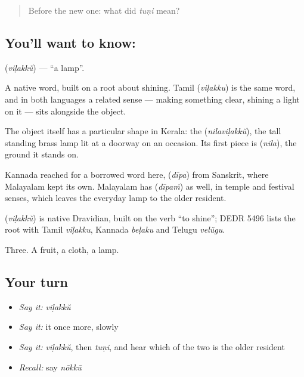 \begin{quote}
Before the new one: what did \emph{tuṇi} mean?
\end{quote}

\subsection*{You'll want to know: }
\textbf{} (\emph{viḷakkŭ}) — \textquotedblleft{}a lamp\textquotedblright{}.

A native word, built on a root about shining. Tamil  (\emph{viḷakku}) is the same word, and in both languages a related sense — making something clear, shining a light on it — sits alongside the object.

The object itself has a particular shape in Kerala: the  (\emph{nilaviḷakkŭ}), the tall standing brass lamp lit at a doorway on an occasion. Its first piece is  (\emph{nila}), the ground it stands on.

Kannada reached for a borrowed word here,  (\emph{dīpa}) from Sanskrit, where Malayalam kept its own. Malayalam has  (\emph{dīpaṁ}) as well, in temple and festival senses, which leaves the everyday lamp to the older resident.

\begin{cousinweb}
\textbf{} (\emph{viḷakkŭ}) is native Dravidian, built on the verb \textquotedblleft{}to shine\textquotedblright{}; DEDR 5496 lists the root with Tamil \emph{viḷakku}, Kannada \emph{beḷaku} and Telugu \emph{velũgu}.
\end{cousinweb}

\begin{grammarlens}[title={What you've built}]
Three. A fruit, a cloth, a lamp.
\end{grammarlens}

\subsection*{Your turn}
\begin{itemize}
\raggedright
  \item \emph{Say it:} \emph{viḷakkŭ}
  \item \emph{Say it:} it once more, slowly
  \item \emph{Say it:} \emph{viḷakkŭ}, then \emph{tuṇi}, and hear which of the two is the older resident
  \item \emph{Recall:} say \emph{nōkkū}
\end{itemize}

